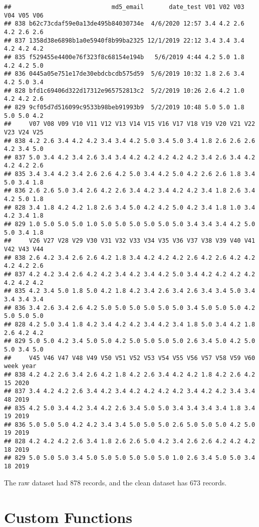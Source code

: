 \documentclass[
]{article}
\begin{document}
\begin{verbatim}
##                            md5_email       date_test V01 V02 V03 V04 V05 V06
## 838 b62c73cdaf59e0a13de495b84030734e  4/6/2020 12:57 3.4 4.2 2.6 4.2 2.6 2.6
## 837 1358d38e6898b1a0e5940f8b99ba2325 12/1/2019 22:12 3.4 3.4 3.4 4.2 4.2 4.2
## 835 f529455e4400e76f323f8c68154e194b   5/6/2019 4:44 4.2 5.0 1.8 4.2 4.2 5.0
## 836 0445a05e751e17de30ebdcbcdb575d59  5/6/2019 10:32 1.8 2.6 3.4 4.2 5.0 3.4
## 828 bfd1c69406d322d17312e965752813c2  5/2/2019 10:26 2.6 4.2 1.0 4.2 4.2 2.6
## 829 9cf05d7d516099c9533b98beb91993b9  5/2/2019 10:48 5.0 5.0 1.8 5.0 5.0 4.2
##     V07 V08 V09 V10 V11 V12 V13 V14 V15 V16 V17 V18 V19 V20 V21 V22 V23 V24 V25
## 838 4.2 2.6 3.4 4.2 4.2 3.4 3.4 4.2 5.0 3.4 5.0 3.4 1.8 2.6 2.6 2.6 4.2 3.4 5.0
## 837 5.0 3.4 4.2 3.4 2.6 3.4 3.4 4.2 4.2 4.2 4.2 4.2 3.4 2.6 3.4 4.2 4.2 4.2 2.6
## 835 3.4 3.4 4.2 3.4 2.6 2.6 4.2 5.0 3.4 4.2 5.0 4.2 2.6 2.6 1.8 3.4 5.0 3.4 1.8
## 836 2.6 2.6 5.0 3.4 2.6 4.2 2.6 3.4 4.2 3.4 4.2 4.2 3.4 1.8 2.6 3.4 4.2 5.0 1.8
## 828 3.4 1.8 4.2 4.2 1.8 2.6 3.4 5.0 4.2 4.2 5.0 4.2 3.4 1.8 1.0 3.4 4.2 3.4 1.8
## 829 1.0 5.0 5.0 5.0 1.0 5.0 5.0 5.0 5.0 5.0 5.0 3.4 3.4 3.4 4.2 5.0 5.0 3.4 1.8
##     V26 V27 V28 V29 V30 V31 V32 V33 V34 V35 V36 V37 V38 V39 V40 V41 V42 V43 V44
## 838 2.6 4.2 3.4 2.6 2.6 4.2 1.8 3.4 4.2 4.2 4.2 2.6 4.2 2.6 4.2 4.2 4.2 4.2 2.6
## 837 4.2 4.2 3.4 2.6 4.2 4.2 3.4 4.2 3.4 4.2 5.0 3.4 4.2 4.2 4.2 4.2 4.2 4.2 4.2
## 835 4.2 3.4 5.0 1.8 5.0 4.2 1.8 4.2 3.4 2.6 3.4 2.6 3.4 3.4 5.0 3.4 3.4 3.4 3.4
## 836 3.4 2.6 3.4 2.6 4.2 5.0 5.0 5.0 5.0 5.0 5.0 3.4 5.0 5.0 5.0 4.2 5.0 5.0 5.0
## 828 4.2 5.0 3.4 1.8 4.2 3.4 4.2 4.2 3.4 4.2 3.4 1.8 5.0 3.4 4.2 1.8 2.6 4.2 4.2
## 829 5.0 5.0 4.2 3.4 5.0 5.0 4.2 5.0 5.0 5.0 5.0 2.6 3.4 5.0 4.2 5.0 5.0 3.4 5.0
##     V45 V46 V47 V48 V49 V50 V51 V52 V53 V54 V55 V56 V57 V58 V59 V60 week year
## 838 4.2 4.2 2.6 3.4 2.6 4.2 1.8 4.2 2.6 3.4 4.2 4.2 1.8 4.2 2.6 4.2   15 2020
## 837 3.4 4.2 4.2 2.6 3.4 4.2 3.4 4.2 4.2 4.2 4.2 3.4 4.2 4.2 3.4 3.4   48 2019
## 835 4.2 5.0 3.4 4.2 3.4 4.2 2.6 3.4 5.0 5.0 3.4 3.4 3.4 3.4 1.8 3.4   19 2019
## 836 5.0 5.0 5.0 4.2 4.2 3.4 3.4 5.0 5.0 5.0 2.6 5.0 5.0 5.0 4.2 5.0   19 2019
## 828 4.2 4.2 4.2 2.6 3.4 1.8 2.6 2.6 5.0 4.2 3.4 2.6 2.6 4.2 4.2 4.2   18 2019
## 829 5.0 5.0 5.0 3.4 5.0 5.0 5.0 5.0 5.0 5.0 1.0 2.6 3.4 5.0 5.0 3.4   18 2019
\end{verbatim}

The raw dataset had 878 records, and the clean dataset has 673 records.

\hypertarget{custom-functions}{%
\section{Custom Functions}\label{custom-functions}}
\end{document}
